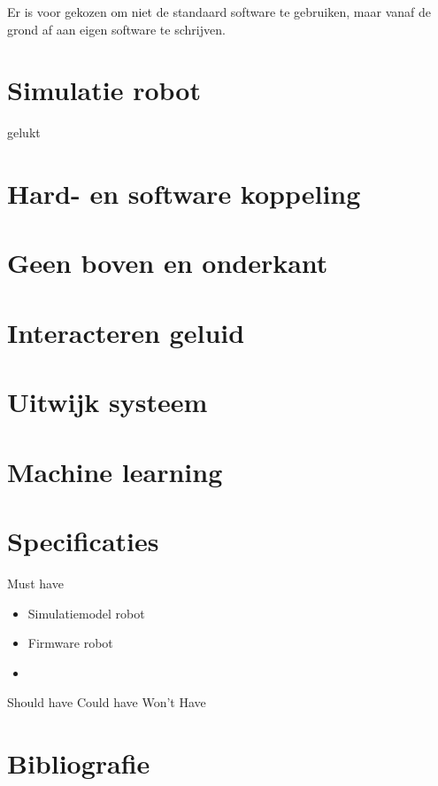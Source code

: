 \documentclass[10pt,a4paper]{article}
\begin{document}
Er is voor gekozen om niet de standaard software te gebruiken, maar vanaf de grond af aan eigen software te schrijven.

\section{Simulatie robot}
gelukt

\section{Hard- en software koppeling}


\section{Geen boven en onderkant}

\section{Interacteren geluid}

\section{Uitwijk systeem}

\section{Machine learning}

\section{Specificaties}
Must have
\begin{itemize}
\setlength\itemsep{0em}
\item Simulatiemodel robot
\item Firmware robot
\item 
\end{itemize}
Should have
Could have
Won't Have


\section{Bibliografie}


\end{document}
